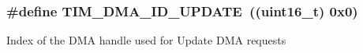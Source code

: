 \subsubsection[{\texorpdfstring{T\+I\+M\+\_\+\+D\+M\+A\+\_\+\+I\+D\+\_\+\+U\+P\+D\+A\+TE}{TIM_DMA_ID_UPDATE}}]{\setlength{\rightskip}{0pt plus 5cm}\#define T\+I\+M\+\_\+\+D\+M\+A\+\_\+\+I\+D\+\_\+\+U\+P\+D\+A\+TE~((uint16\+\_\+t) 0x0)}\hypertarget{group___d_m_a___handle__index_ga15f38cee11f8b2b5a85cbf4552ba140d}{}\label{group___d_m_a___handle__index_ga15f38cee11f8b2b5a85cbf4552ba140d}
Index of the D\+MA handle used for Update D\+MA requests 
